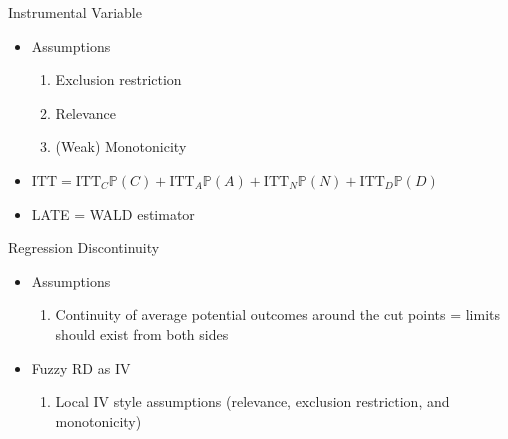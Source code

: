 \documentclass[handout]{beamer}
\begin{document}
\begin{frame}{Instrumental Variable}
    \begin{itemize}
        \item Assumptions
            \begin{enumerate}
                \item Exclusion restriction
                \item Relevance
                \item (Weak) Monotonicity
            \end{enumerate}
        \item $\mathrm{ITT} = \mathrm{ITT}_C \mathbb{P}\left( C \right) + \mathrm{ITT}_A \mathbb{P}\left( A \right) + \mathrm{ITT}_N \mathbb{P}\left( N \right) + \mathrm{ITT}_D \mathbb{P}\left( D \right)  $
        \item LATE = WALD estimator
    \end{itemize}
\end{frame}

\begin{frame}{Regression Discontinuity}
\begin{itemize}
    \item Assumptions
        \begin{enumerate}
            \item Continuity of average potential outcomes around the cut points = limits should exist from both sides
        \end{enumerate}
    \item Fuzzy RD as IV
        \begin{enumerate}
            \item Local IV style assumptions (relevance, exclusion restriction, and monotonicity)
        \end{enumerate}
\end{itemize}
\end{frame}
\end{document}
